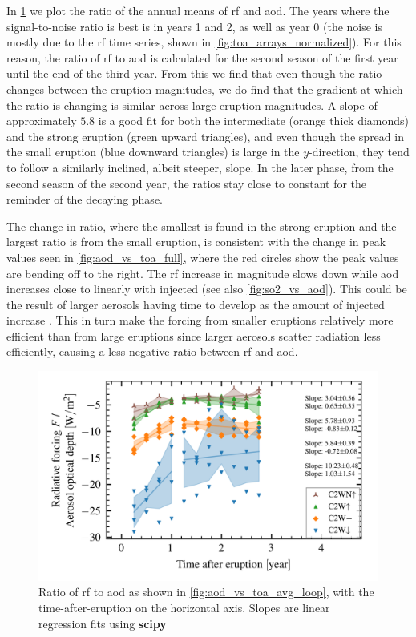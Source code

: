 \documentclass{ametsocV5}
\begin{document}
In \cref{fig:aod_vs_toa_avg_loop_ratio} we plot the ratio of the annual means of
\acrshort{rf} and \acrshort{aod}. The years where the signal-to-noise ratio is best is
in years 1 and 2, as well as year 0 (the noise is mostly due to the \acrshort{rf} time
series, shown in \cref{fig:toa_arrays_normalized}). For this reason, the ratio of
\acrshort{rf} to \acrshort{aod} is calculated for the second season of the first year
until the end of the third year. From this we find that even though the ratio changes
between the eruption magnitudes, we do find that the gradient at which the ratio is
changing is similar across large eruption magnitudes. A slope of approximately \( 5.8 \)
is a good fit for both the intermediate (orange thick diamonds) and the strong eruption
(green upward triangles), and even though the spread in the small eruption (blue
downward triangles) is large in the \( y \)-direction, they tend to follow a similarly
inclined, albeit steeper, slope. In the later phase, from the second season of the
second year, the ratios stay close to constant for the reminder of the decaying phase.

The change in ratio, where the smallest is found in the strong eruption and the largest
ratio is from the small eruption, is consistent with the change in peak values seen in
\cref{fig:aod_vs_toa_full}, where the red circles show the peak values are bending off
to the right. The \acrshort{rf} increase in magnitude slows down while \acrshort{aod}
increases close to linearly with injected  (see also \cref{fig:so2_vs_aod}).
This could be the result of larger aerosols having time to develop as the amount of
injected  increase \citep{niemeier2015,marshall2019}. This in turn make the
forcing from smaller eruptions relatively more efficient than from large eruptions since
larger aerosols scatter radiation less efficiently, causing a less negative ratio
between \acrshort{rf} and \acrshort{aod}.

\begin{figure}[t]
  \begin{center}
    \includegraphics[width=0.95\linewidth]{figures/aod_vs_toa_avg_loop_ratio.png}
  \end{center}
  \caption{
    Ratio of \acrshort{rf} to \acrshort{aod} as shown in
    \cref{fig:aod_vs_toa_avg_loop}, with the time-after-eruption on the horizontal axis.
    Slopes are linear regression fits using \textbf{scipy}
  }%
  \label{fig:aod_vs_toa_avg_loop_ratio}
\end{figure}
\end{document}
